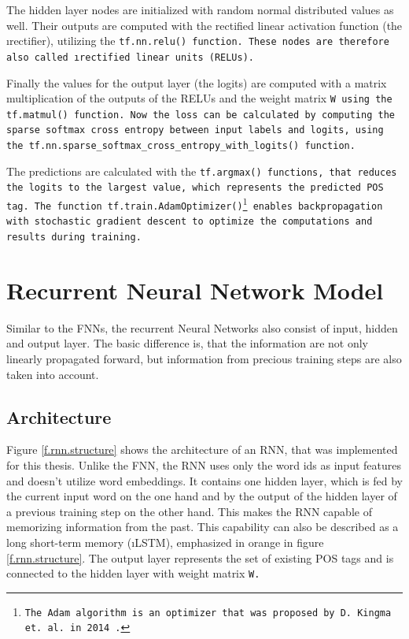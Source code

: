 
The hidden layer nodes are initialized with random normal distributed values as well. Their outputs are computed with the rectified linear activation function (the \i{rectifier}), utilizing the \tt{tf.nn.relu()} function. These nodes are therefore also called \i{rectified linear units} (RELUs).

Finally the values for the output layer (the logits) are computed with a matrix multiplication of the outputs of the RELUs and the weight matrix \tt{W} using the \tt{tf.matmul()} function. Now the loss can be calculated by computing the sparse softmax cross entropy between input labels and logits, using the \tt{tf.nn.sparse\_softmax\_cross\_entropy\_with\_logits()} function.

The predictions are calculated with the \tt{tf.argmax()} functions, that reduces the logits to the largest value, which represents the predicted POS tag. The function \tt{tf.train.AdamOptimizer()}\footnote{The Adam algorithm is an optimizer that was proposed by D. Kingma et. al. in 2014 \cite{kingma2014}.} enables backpropagation with stochastic gradient descent to optimize the computations and results during training.


\section{Recurrent Neural Network Model}\label{c.postagging.rnn}
Similar to the FNNs, the recurrent Neural Networks also consist of input, hidden and output layer. The basic difference is, that the information are not only linearly propagated forward, but information from precious training steps are also taken into account.

\subsection{Architecture}\label{c.postagging.rnn.architecture}
Figure \ref{f.rnn.structure} shows the architecture of an RNN, that was implemented for this thesis. Unlike the FNN, the RNN uses only the word ids as input features and doesn't utilize word embeddings. It contains one hidden layer, which is fed by the current input word on the one hand and by the output of the hidden layer of a previous training step on the other hand. This makes the RNN capable of memorizing information from the past. This capability can also be described as a long short-term memory (\i{LSTM}), emphasized in orange in figure \ref{f.rnn.structure}. The output layer represents the set of existing POS tags and is connected to the hidden layer with weight matrix
\tt{W}.

